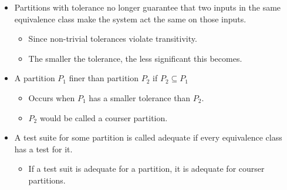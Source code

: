 \documentclass{article}
\begin{document}
\begin{itemize}
\begin{itemize}
		\begin{itemize}
			\item Ex. $x$ is equivalent to $y$ if $|x - y| \le 1$.
			\begin{itemize}
				\item Here, our tolerance is 1.
				\item Tolerance is also called delta.
			\end{itemize}
		\end{itemize}
	\end{itemize}
	\item Partitions with tolerance no longer guarantee that two inputs in the same equivalence class make the system act the same on those inputs.
	\begin{itemize}
		\item Since non-trivial tolerances violate transitivity.
		\item The smaller the tolerance, the less significant this becomes.
	\end{itemize}
	\item A partition $P_1$ finer than partition $P_2$ if $P_2 \subseteq P_1$
	\begin{itemize}
		\item Occurs when $P_1$ has a smaller tolerance than $P_2$.
		\item $P_2$ would be called a courser partition.
	\end{itemize}
	\item A test suite for some partition is called adequate if every equivalence class has a test for it.
	\begin{itemize}
		\item If a test suit is adequate for a partition, it is adequate for courser partitions.
	\end{itemize}
\end{itemize}

\ifdefined\iscombined
	\newpage
\else
	
\end{document}

